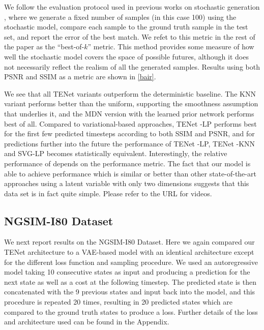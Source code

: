 \documentclass{article}
\newcommand{\modelname}{TENet }
\begin{document}
We follow the evaluation protocol used in previous works on stochastic generation \citep{Walker2016, Babaeizadeh2018, Denton2018}, where we generate a fixed number of samples (in this case 100) using the stochastic model, compare each sample to the ground truth sample in the test set, and report the error of the best match.
We refet to this metric in the rest of the paper as the ``best-of-$k$'' metric.
This method provides some measure of how well the stochastic model covers the space of possible futures, although it does not necessarily reflect the realism of all the generated samples.
Results using both PSNR and SSIM \citep{SSIM} as a metric are shown in \cref{bair}.

We see that all \modelname variants outperform the deterministic baseline.
The KNN variant performs better than the uniform, supporting the smoothness assumption that underlies it, and the MDN version with the learned prior network performs best of all.
Compared to variational-based approaches, \modelname-LP performs best for the first few predicted timesteps according to both SSIM and PSNR, and for predictions further into the future the performance of \modelname-LP, \modelname-KNN and SVG-LP becomes statistically equivalent.
 Interestingly, the relative performance of \citep{Babaeizadeh2018} depends on the performance metric.
The fact that our model is able to achieve performance which is similar or better than other state-of-the-art approaches using a latent variable with only two dimensions suggests that this data set is in fact quite simple.
Please refer to the URL for videos.

\subsection{NGSIM-I80 Dataset}

We next report results on the NGSIM-I80 Dataset.
Here we again compared our \modelname architecture to a VAE-based model with an identical architecture except for the different loss function and sampling procedure.
We used an autoregressive model taking 10 consecutive states as input and producing a prediction for the next state as well as a cost at the following timestep.
The predicted state is then concatenated with the 9 previous states and input back into the model, and this procedure is repeated 20 times, resulting in 20 predicted states which are compared to the ground truth states to produce a loss.
Further details of the loss and architecture used can be found in the Appendix.
\end{document}
